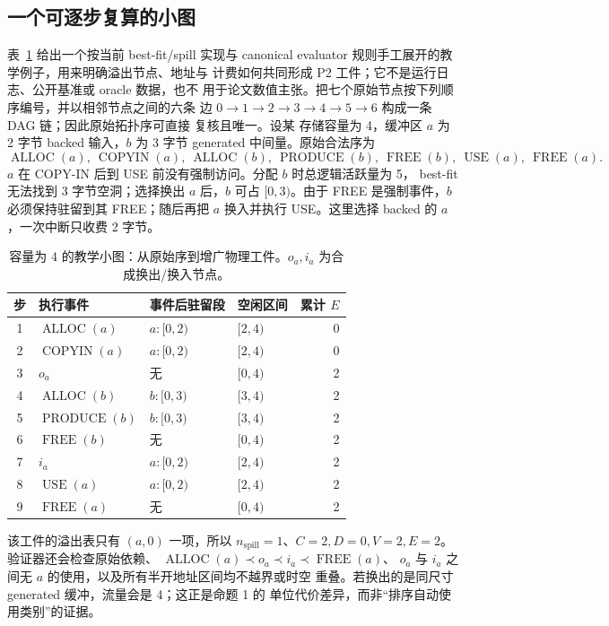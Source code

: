 \subsection{一个可逐步复算的小图}

表~\ref{tab:supp-toy-trace-zh} 给出一个按当前 best-fit/spill 实现与
canonical evaluator 规则手工展开的教学例子，用来明确溢出节点、地址与
计费如何共同形成 P2 工件；它不是运行日志、公开基准或 oracle 数据，也不
用于论文数值主张。把七个原始节点按下列顺序编号，并以相邻节点之间的六条
边 $0\to1\to2\to3\to4\to5\to6$ 构成一条 DAG 链；因此原始拓扑序可直接
复核且唯一。设某
存储容量为 4，缓冲区 $a$ 为 2 字节 backed 输入，$b$ 为 3 字节 generated
中间量。原始合法序为
\[
 \operatorname{ALLOC}(a),\ \operatorname{COPYIN}(a),\
 \operatorname{ALLOC}(b),\ \operatorname{PRODUCE}(b),\
 \operatorname{FREE}(b),\ \operatorname{USE}(a),\ \operatorname{FREE}(a).
\]
$a$ 在 COPY-IN 后到 USE 前没有强制访问。分配 $b$ 时总逻辑活跃量为 5，
best-fit 无法找到 3 字节空洞；选择换出 $a$ 后，$b$ 可占 $[0,3)$。由于
FREE 是强制事件，$b$ 必须保持驻留到其 FREE；随后再把 $a$ 换入并执行
USE。这里选择 backed 的 $a$，一次中断只收费 2 字节。

\begin{table}[H]
\centering
\caption{容量为 4 的教学小图：从原始序到增广物理工件。$o_a,i_a$ 为合成换出/换入节点。}
\label{tab:supp-toy-trace-zh}
\begin{tabular}{@{}clllr@{}}
\toprule
步 & 执行事件 & 事件后驻留段 & 空闲区间 & 累计 $E$\\
\midrule
1 & $\operatorname{ALLOC}(a)$ & $a:[0,2)$ & $[2,4)$ & 0\\
2 & $\operatorname{COPYIN}(a)$ & $a:[0,2)$ & $[2,4)$ & 0\\
3 & $o_a$ & 无 & $[0,4)$ & 2\\
4 & $\operatorname{ALLOC}(b)$ & $b:[0,3)$ & $[3,4)$ & 2\\
5 & $\operatorname{PRODUCE}(b)$ & $b:[0,3)$ & $[3,4)$ & 2\\
6 & $\operatorname{FREE}(b)$ & 无 & $[0,4)$ & 2\\
7 & $i_a$ & $a:[0,2)$ & $[2,4)$ & 2\\
8 & $\operatorname{USE}(a)$ & $a:[0,2)$ & $[2,4)$ & 2\\
9 & $\operatorname{FREE}(a)$ & 无 & $[0,4)$ & 2\\
\bottomrule
\end{tabular}
\end{table}

该工件的溢出表只有 $(a,0)$ 一项，所以
$n_{\mathrm{spill}}=1$、$C=2,D=0,V=2,E=2$。验证器还会检查原始依赖、
$\operatorname{ALLOC}(a)\prec o_a\prec i_a\prec\operatorname{FREE}(a)$、
$o_a$ 与 $i_a$ 之间无 $a$ 的使用，以及所有半开地址区间均不越界或时空
重叠。若换出的是同尺寸 generated 缓冲，流量会是 4；这正是命题 1 的
单位代价差异，而非“排序自动使用类别”的证据。


